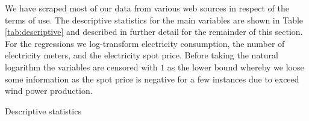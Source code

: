 \label{sec:data}
We have scraped most of our data from various web sources in respect of the terms of use. The descriptive statistics for the main variables are shown in Table \ref{tab:descriptive} and described in further detail for the remainder of this section.
\medskip\\
For the regressions we log-transform electricity consumption, the number of electricity meters, and the electricity spot price. Before taking the natural logarithm the variables are censored with $1$ as the lower bound whereby we loose some information as the spot price is negative for a few instances due to exceed wind power production.
\begin{table}[H]
  \centering
  \caption{Descriptive statistics}
  \label{tab:descriptive}
  \footnotesize
    
\end{table}


